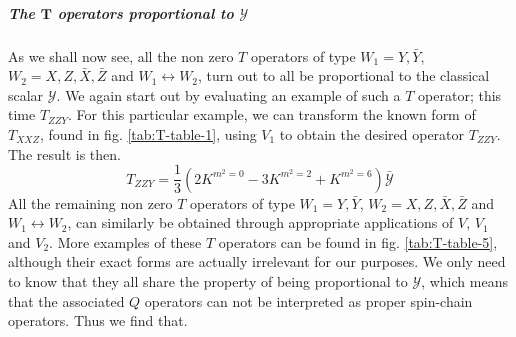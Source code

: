\subparagraph[The $T$ operators proportional to $\mathcal{Y}$]{The $\mathbf{T}$ operators proportional to $\mathbf{\mathcal{Y}}$}
As we shall now see, all the non zero $T$ operators of type $W_1 = Y, \bar{Y}$, $W_2 = X, Z, \bar{X}, \bar{Z}$ and $W_1 \leftrightarrow W_2$, turn out to all be proportional to the classical scalar $\mathcal{Y}$. We again start out by evaluating an example of such a $T$ operator; this time $T_{ZZY}$. For this particular example, we can transform the known form of $T_{XXZ}$, found in fig. \ref{tab:T-table-1}, using $V_1$ to obtain the desired operator $T_{ZZY}$. The result is then.
%
%
\begin{equation}
T_{ZZY}
=
\frac{1}{3} \left( 2 K^{m^2 = 0} - 3 K^{m^2 = 2} + K^{m^2 = 6} \right) \bar{\mathcal{Y}}
\end{equation}
%
%
All the remaining non zero $T$ operators of type $W_1 = Y, \bar{Y}$, $W_2 = X, Z, \bar{X}, \bar{Z}$ and $W_1 \leftrightarrow W_2$, can similarly be obtained through appropriate applications of $V$, $V_1$ and $V_2$. More examples of these $T$ operators can be found in fig. \ref{tab:T-table-5}, although their exact forms are actually irrelevant for our purposes. We only need to know that they all share the property of being proportional to $\mathcal{Y}$, which means that the associated $Q$ operators can not be interpreted as proper spin-chain operators. Thus we find that.

